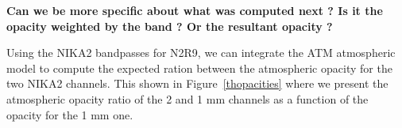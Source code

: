 {\bf Can we be more specific about what was computed next ? Is it the
  opacity weighted by the band ? Or the resultant opacity ?}

Using the NIKA2 bandpasses for N2R9, we can integrate the ATM atmospheric model to compute the expected ration between the atmospheric opacity for the two NIKA2 channels. This shown in Figure~\ref{thopacities} where we present the atmospheric opacity ratio of the 2 and 1 mm channels as a function of the opacity for the 1 mm one.

